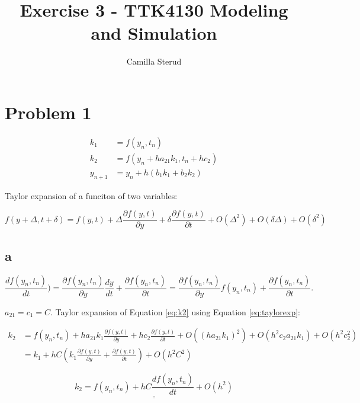 \documentclass{article}
\title{Exercise 3 - TTK4130 Modeling and Simulation}
\author{Camilla Sterud}
\date{}
\begin{document}
\maketitle

\newpage

\section{Problem 1}

\begin{align}
	k_1 &= f(y_n,t_n)\label{eq:k1}\\
	k_2 &= f(y_n + ha_{21}k_1,t_n + hc_2)\label{eq:k2}\\
	y_{n+1} &= y_n + h(b_1k_1 + b_2k_2)\label{eq:ynext}
\end{align}

Taylor expansion of a funciton of two variables:

\begin{equation}\label{eq:taylorexp}
	f(y + \Delta, t + \delta) = f(y,t) + \Delta\frac{\partial f(y,t)}{\partial y} + \delta\frac{\partial f(y,t)}{\partial t} + O(\Delta^2) + O(\delta\Delta) + O(\delta^2)
\end{equation}


\subsection{a}



\begin{equation*}
	\frac{df(y_n,t_n)}{dt}) = \frac{\partial f(y_n,t_n)}{\partial y}\frac{dy}{dt} + \frac{\partial f(y_n,t_n)}{\partial t} = \frac{\partial f(y_n,t_n)}{\partial y}f(y_n,t_n)+ \frac{\partial f(y_n,t_n)}{\partial t}.
\end{equation*}

$a_{21} = c_1 = C$. Taylor expansion of Equation \ref{eq:k2} using Equation \ref{eq:taylorexp}:

\begin{align*}
	k_2 &= f(y_n,t_n) + ha_{21}k_1\frac{\partial f(y,t)}{\partial y} + hc_2\frac{\partial f(y,t)}{\partial t} + O((ha_{21}k_1)^2) + O(h^2c_2a_{21}k_1) + O(h^2c_2^2)\\
	&= k_1 + hC(k_1\frac{\partial f(y,t)}{\partial y} + \frac{\partial f(y,t)}{\partial t}) + O(h^2C^2)
\end{align*}

\begin{equation}\label{eq:k2exp}
	\underline{\underline{k_2 = f(y_n,t_n) + hC\frac{df(y_n,t_n)}{dt} + O(h^2)}}
\end{equation}
\end{document}
